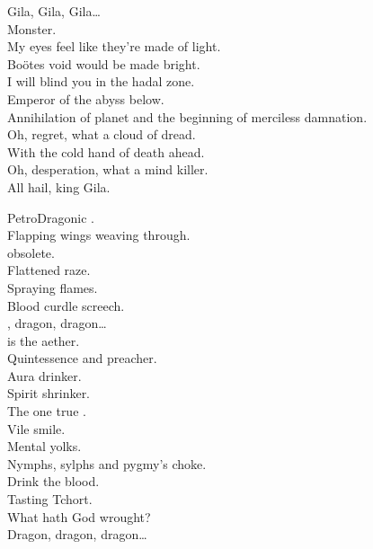 Gila, Gila, Gila… \\
Monster. \\

My eyes feel like they're made of light. \\
Boötes void would be made bright. \\
I will blind you in the hadal zone. \\
Emperor of the abyss below. \\

Annihilation of planet  and the beginning of merciless damnation. \\

Oh, regret, what a cloud of dread. \\
With the cold hand of death ahead. \\
Oh, desperation, what a mind killer. \\
All hail, king Gila. \\



PetroDragonic . \\

Flapping wings weaving through. \\
 obsolete. \\
Flattened raze. \\
Spraying flames. \\
Blood curdle screech. \\

, dragon, dragon… \\

 is the aether. \\
Quintessence and preacher. \\
Aura drinker. \\
Spirit shrinker. \\
The one true . \\
Vile smile. \\
Mental yolks. \\
Nymphs, sylphs and pygmy's choke. \\
Drink the blood. \\
Tasting Tchort. \\
What hath God wrought? \\

Dragon, dragon, dragon… \\

